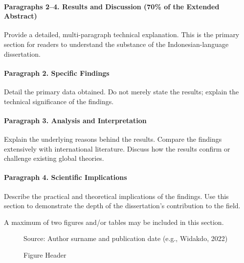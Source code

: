 \paragraph{Paragraphs 2--4. Results and Discussion (70\% of the Extended Abstract)}

Provide a detailed, multi-paragraph technical explanation. This is the primary section for readers to understand the substance of the Indonesian-language dissertation.

\paragraph{Paragraph 2. Specific Findings}

Detail the primary data obtained. Do not merely state the results; explain the technical significance of the findings.

\paragraph{Paragraph 3. Analysis and Interpretation}

Explain the underlying reasons behind the results. Compare the findings extensively with international literature. Discuss how the results confirm or challenge existing global theories.

\paragraph{Paragraph 4. Scientific Implications}

Describe the practical and theoretical implications of the findings. Use this section to demonstrate the depth of the dissertation’s contribution to the field.

A maximum of two figures and/or tables may be included in this section.

\begin{figure}[h]
	\centering
	\caption{Figure Header}
	\small Source: Author surname and publication date (e.g., Widakdo, 2022)
\end{figure}

	
	
